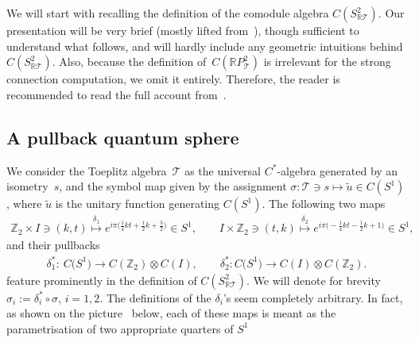 \documentclass[pdftex]{sigma}
\newcommand{\qcp}[1]{{C(\mathbb{R} P^{#1}_\mathcal{T})}}
\begin{document}
We will start with recalling the def\/inition of the comodule algebra ${C(S^2_{\mathbb{R}\mathcal{T}})}$.
Our presentation will be very brief (mostly lifted from~\cite{reduct}), though suf\/f\/icient to understand what follows,
and will hardly include any geometric intuitions behind ${C(S^2_{\mathbb{R}\mathcal{T}})}$.
Also, because the def\/inition of~$\qcp 2$ is irrelevant for the strong connection computation, we omit it entirely.
Therefore, the reader is recommended to read the full account from~\cite{reduct}.

\subsection{A pullback quantum sphere}

We consider the Toeplitz algebra~$\mathcal{T}$ as the universal $C^*$-algebra generated by an isometry~$s$, and the
symbol map given by the assignment $\sigma\colon\mathcal{T}\ni s\mapsto \widetilde{u}\in C(S^1)$, where $\widetilde{u}$
is the unitary function generating $C(S^1)$.
The following two maps
\begin{gather*}
{\mathbb Z_2}\times I\ni(k,t)\stackrel{\delta_1}{\longmapsto} e^{i\pi\big(\frac{1}{4}kt+\frac{1}{2}k+\frac{3}{2}\big)}\in S^1,
\qquad
I\times{\mathbb Z_2}\ni(t,k)\stackrel{\delta_2}{\longmapsto} e^{i\pi\big({-}\frac{1}{4}kt-\frac{1}{2}k+1\big)}\in S^1,
\end{gather*}
and their pullbacks
\begin{gather*}
\delta^*_1: \  C\big(S^1\big)\longrightarrow C({\mathbb Z_2})\otimes C(I),
\qquad
\delta^*_2\colon C\big(S^1\big)\longrightarrow C(I)\otimes C({\mathbb Z_2}).
\end{gather*}
feature prominently in the def\/inition of ${C(S^2_{\mathbb{R}\mathcal{T}})}$.
We will denote for brevity $\sigma_i:=\delta^*_i\circ\sigma$, $i=1,2$.
The def\/initions of the $\delta_i$'s seem completely arbitrary.
In fact, as shown on the picture~\cite{reduct} below, each of these maps is meant as the parametrisation
of two appropriate quarters of $S^1$
\end{document}
